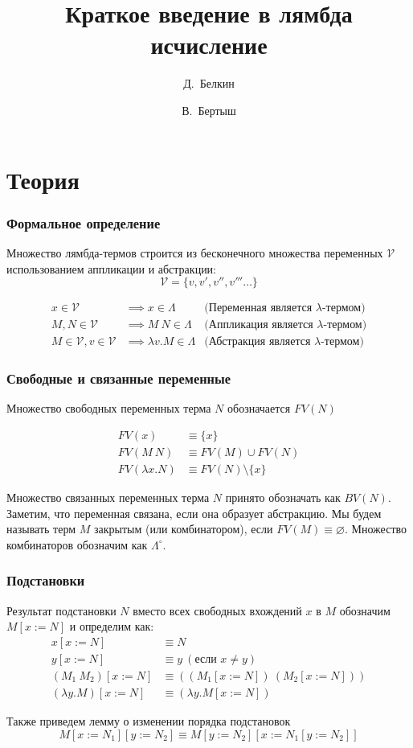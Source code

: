 \documentclass{beamer}
\title[Лямбда исчисление]{Краткое введение в лямбда исчисление}
\author[Белкин, Бертыш]{Д.~Белкин \and В.~Бертыш}
\begin{document}
\frame{\titlepage}

\section{Теория}

\frame{\sectionpage}

\begin{frame}\frametitle{Формальное определение}

Множество лямбда-термов строится из бесконечного множества переменных $\mathcal{V}$ использованием аппликации и абстракции:
\[\mathcal{V} = \{ v, v', v'', v''' \dots \}\]

\begin{align*}
	x \in \mathcal{V} & \implies x \in \Lambda &\text{(Переменная является $\lambda$-термом)}\\
	M, N \in \mathcal{V} & \implies M\ N \in \Lambda &\text{(Аппликация является $\lambda$-термом)}\\
	M \in \mathcal{V}, v \in \mathcal{V} & \implies \lambda v.M \in \Lambda &\text{(Абстракция является $\lambda$-термом)}
\end{align*}

\end{frame}

\begin{frame}\frametitle{Свободные и связанные переменные}

Множество свободных переменных терма $N$ обозначается $FV(N)$

\begin{align*}
	FV(x) 			&\equiv \{x\}\\
	FV(M\ N) 		&\equiv FV(M)\cup FV(N)\\
	FV(\lambda x.N) &\equiv FV(N)\setminus\{x\}
\end{align*}
    
Множество связанных переменных терма $N$ принято обозначать как $BV(N)$.
Заметим, что переменная связана, если она образует абстракцию.
Мы будем называть терм $M$ закрытым (или комбинатором), если \(FV(M) \equiv \varnothing\).
Множество комбинаторов обозначим как $\Lambda^\circ$.

\end{frame}

\begin{frame}\frametitle{Подстановки}
    
Результат подстановки $N$ вместо всех свободных вхождений $x$ в $M$ обозначим $M[x := N]$ и определим как:
\begin{align*}
	x[x := N] &\equiv N\\
	y[x := N] &\equiv y\ (\text{если } x \neq y)\\
	(M_1 \ M_2 )[x := N] &\equiv ((M_1 [x := N])\ (M_2 [x := N]))\\
	(\lambda y.M)[x := N] &\equiv (\lambda y.M[x := N])
\end{align*}

Также приведем лемму о изменении порядка подстановок
\begin{equation*}
	M[x := N_1][y := N_2] \equiv M[y := N_2][x := N_1[y := N_2]]
\end{equation*}

\end{frame}
\end{document}
